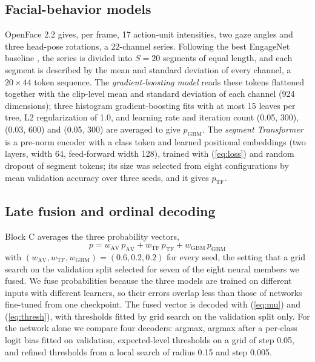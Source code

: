 \documentclass[pdflatex,iicol,sn-basic]{sn-jnl}
\begin{document}
\subsection{Facial-behavior models}\label{sec:method_beh}

OpenFace 2.2 \citep{baltrusaitis2018openface} gives, per frame, 17 action-unit intensities, two gaze angles and three head-pose rotations, a 22-channel series. Following the best EngageNet baseline \citep{singh2023engagenet}, the series is divided into $S = 20$ segments of equal length, and each segment is described by the mean and standard deviation of every channel, a $20 \times 44$ token sequence. The \emph{gradient-boosting model} reads these tokens flattened together with the clip-level mean and standard deviation of each channel (924 dimensions); three histogram gradient-boosting fits with at most 15 leaves per tree, L2 regularization of 1.0, and learning rate and iteration count (0.05, 300), (0.03, 600) and (0.05, 300) are averaged to give $p_{\mathrm{GBM}}$. The \emph{segment Transformer} is a pre-norm encoder with a class token and learned positional embeddings (two layers, width 64, feed-forward width 128), trained with (\ref{eq:loss}) and random dropout of segment tokens; its size was selected from eight configurations by mean validation accuracy over three seeds, and it gives $p_{\mathrm{TF}}$.

\subsection{Late fusion and ordinal decoding}\label{sec:method_fusion}

Block C averages the three probability vectors,
\begin{equation}
p = w_{\mathrm{AV}}\, p_{\mathrm{AV}} + w_{\mathrm{TF}}\, p_{\mathrm{TF}} + w_{\mathrm{GBM}}\, p_{\mathrm{GBM}} \label{eq:late}
\end{equation}
with $(w_{\mathrm{AV}}, w_{\mathrm{TF}}, w_{\mathrm{GBM}}) = (0.6, 0.2, 0.2)$ for every seed, the setting that a grid search on the validation split selected for seven of the eight neural members we fused. We fuse probabilities because the three models are trained on different inputs with different learners, so their errors overlap less than those of networks fine-tuned from one checkpoint. The fused vector is decoded with (\ref{eq:mu}) and (\ref{eq:thresh}), with thresholds fitted by grid search on the validation split only. For the network alone we compare four decoders: argmax, argmax after a per-class logit bias fitted on validation, expected-level thresholds on a grid of step 0.05, and refined thresholds from a local search of radius 0.15 and step 0.005.
\end{document}
